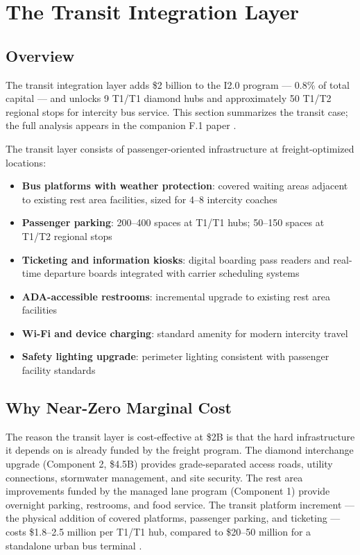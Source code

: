 \section{The Transit Integration Layer}

\subsection{Overview}

The transit integration layer adds \$2 billion to the I2.0 program --- 0.8\% of total capital --- and unlocks 9 T1/T1 diamond hubs and approximately 50 T1/T2 regional stops for intercity bus service. This section summarizes the transit case; the full analysis appears in the companion F.1 paper \citep{ROUTE_F1}.

The transit layer consists of passenger-oriented infrastructure at freight-optimized locations:
\begin{itemize}
  \item \textbf{Bus platforms with weather protection}: covered waiting areas adjacent to existing rest area facilities, sized for 4--8 intercity coaches
  \item \textbf{Passenger parking}: 200--400 spaces at T1/T1 hubs; 50--150 spaces at T1/T2 regional stops
  \item \textbf{Ticketing and information kiosks}: digital boarding pass readers and real-time departure boards integrated with carrier scheduling systems
  \item \textbf{ADA-accessible restrooms}: incremental upgrade to existing rest area facilities
  \item \textbf{Wi-Fi and device charging}: standard amenity for modern intercity travel
  \item \textbf{Safety lighting upgrade}: perimeter lighting consistent with passenger facility standards
\end{itemize}

\subsection{Why Near-Zero Marginal Cost}

The reason the transit layer is cost-effective at \$2B is that the hard infrastructure it depends on is already funded by the freight program. The diamond interchange upgrade (Component 2, \$4.5B) provides grade-separated access roads, utility connections, stormwater management, and site security. The rest area improvements funded by the managed lane program (Component 1) provide overnight parking, restrooms, and food service. The transit platform increment --- the physical addition of covered platforms, passenger parking, and ticketing --- costs \$1.8--2.5 million per T1/T1 hub, compared to \$20--50 million for a standalone urban bus terminal \citep{BTS_intermodal2023}.

